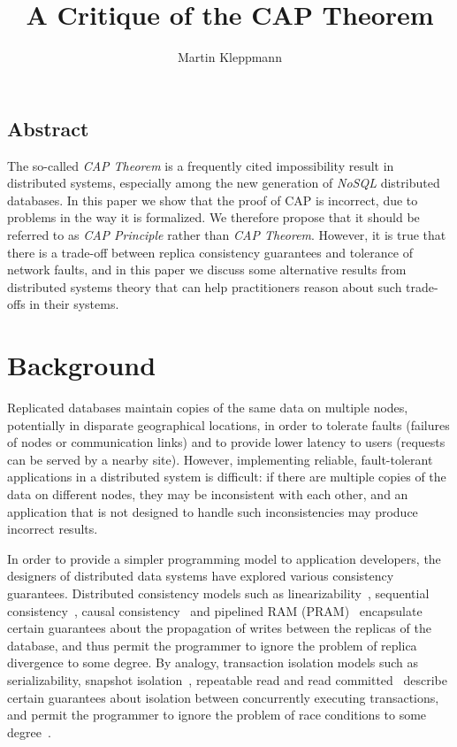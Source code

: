 \documentclass[a4paper,twocolumn,10pt]{article}
\begin{document}
\sloppy
\date{} %
\title{A Critique of the CAP Theorem}
\author{Martin Kleppmann}
\maketitle

\subsection*{Abstract}

The so-called \emph{CAP Theorem} is a frequently cited impossibility result in distributed systems,
especially among the new generation of \emph{NoSQL} distributed databases. In this paper we show
that the proof of CAP is incorrect, due to problems in the way it is formalized. We therefore
propose that it should be referred to as \emph{CAP Principle} rather than \emph{CAP Theorem}.
However, it is true that there is a trade-off between replica consistency guarantees and tolerance
of network faults, and in this paper we discuss some alternative results from distributed systems
theory that can help practitioners reason about such trade-offs in their systems.

\section{Background}

Replicated databases maintain copies of the same data on multiple nodes, potentially in disparate
geographical locations, in order to tolerate faults (failures of nodes or communication links) and
to provide lower latency to users (requests can be served by a nearby site). However, implementing
reliable, fault-tolerant applications in a distributed system is difficult: if there are multiple
copies of the data on different nodes, they may be inconsistent with each other, and an application
that is not designed to handle such inconsistencies may produce incorrect results.

In order to provide a simpler programming model to application developers, the designers of
distributed data systems have explored various consistency guarantees. Distributed consistency
models such as linearizability~\cite{Herlihy1990jq}, sequential consistency~\cite{Lamport1979ky},
causal consistency~\cite{Ahamad1995gl} and pipelined RAM (PRAM)~\cite{Lipton1988uh} encapsulate
certain guarantees about the propagation of writes between the replicas of the database, and thus
permit the programmer to ignore the problem of replica divergence to some degree. By analogy,
transaction isolation models such as serializability, snapshot isolation~\cite{Berenson1995kj},
repeatable read and read committed~\cite{Gray1976us} describe certain guarantees about isolation
between concurrently executing transactions, and permit the programmer to ignore the problem of race
conditions to some degree~\cite{Bailis2014vc}.
\end{document}
